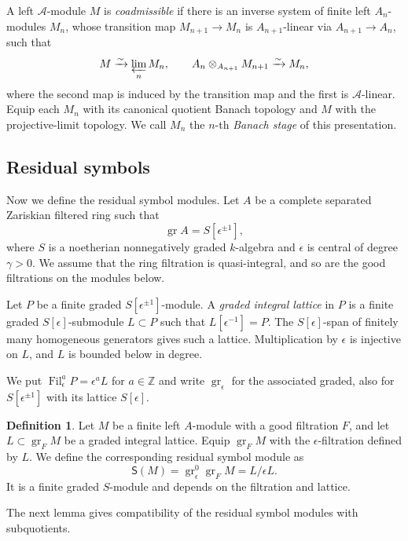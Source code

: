 \documentclass[11pt]{article}
\theoremstyle{definition}
\newtheorem{definition}[theorem]{Definition}
\newcommand{\gr}{\operatorname{gr}}
\newcommand{\Fil}{\operatorname{Fil}}
\begin{document}
\label{def:coadmissible-stages}
A left $\mathscr A$-module $M$ is \emph{coadmissible} if there is an
inverse system of finite left $A_n$-modules $M_n$, whose transition
map $M_{n+1}\to M_n$ is $A_{n+1}$-linear via $A_{n+1}\to A_n$, such that
\[
 M\xrightarrow{\sim}\varprojlim_nM_n,\qquad
 A_n\otimes_{A_{n+1}}M_{n+1}\xrightarrow{\sim}M_n,
\]
where the second map is induced by the transition map and the first is
$\mathscr A$-linear. Equip each $M_n$ with its canonical quotient
Banach topology and $M$ with the projective-limit topology. We call
$M_n$ the $n$-th \emph{Banach stage} of this presentation.

\subsection{Residual symbols}
\label{sec:graded-modules}
Now we define the residual symbol modules. 
Let $A$ be a complete separated Zariskian filtered ring such that
\[
 \gr A=S[\epsilon^{\pm1}],
\]
where $S$ is a noetherian nonnegatively graded $k$-algebra and
$\epsilon$ is central of degree $\gamma>0$.
We assume that the ring filtration is quasi-integral, 
and so are the good filtrations on the modules below. 

Let $P$ be a finite graded $S[\epsilon^{\pm1}]$-module. A
\emph{graded integral lattice} in $P$ is a finite graded
$S[\epsilon]$-submodule $L\subset P$ such that
$L[\epsilon^{-1}]=P$. The $S[\epsilon]$-span of finitely many
homogeneous generators gives such a lattice. Multiplication by
$\epsilon$ is injective on $L$, and $L$ is bounded below in degree.

We put $\Fil_\epsilon^aP=\epsilon^aL$ for $a\in\mathbb Z$ and
write $\gr_\epsilon$ for the associated graded, also for
$S[\epsilon^{\pm1}]$ with its lattice $S[\epsilon]$.

\begin{definition}\label{def:symbol}
Let $M$ be a finite left $A$-module with a good filtration $F$,
and let $L\subset\gr_FM$ be a graded integral lattice.
Equip $\gr_FM$ with the $\epsilon$-filtration defined by $L$.
We define the corresponding residual symbol module as
\[
 \mathsf S(M)=\gr_\epsilon^0\gr_FM=L/\epsilon L.
\]
It is a finite graded $S$-module and depends on the filtration
and lattice.
\end{definition}

The next lemma gives compatibility of the residual symbol modules with subquotients.
\end{document}
